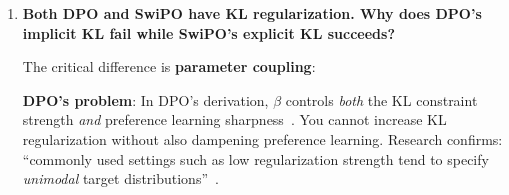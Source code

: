 \begin{enumerate}[label=\textbf{Q\arabic*.}, leftmargin=*, itemsep=8pt]
\textbf{Why it matters}: Instruction-conditioned alignment \textit{requires} multiple behavioral modes:
\begin{itemize}[leftmargin=*,itemsep=1pt]
    \item Mode 1: ``Be concise'' $\rightarrow$ short responses
    \item Mode 2: ``Be detailed'' $\rightarrow$ comprehensive responses
    \item Mode 3: ``Be formal'' $\rightarrow$ professional tone
\end{itemize}

A mode-collapsed model produces similar outputs regardless of instruction, which is exactly what we observe with DPO (+0.001 instruction sensitivity). SwiPO's explicit KL prevents this collapse by maintaining proximity to the reference policy's behavioral diversity.

\vspace{4mm}

\item \textbf{Both DPO and SwiPO have KL regularization. Why does DPO's implicit KL fail while SwiPO's explicit KL succeeds?}

 The critical difference is \textbf{parameter coupling}:

\begin{table}[ht!]
\centering
\normalsize
\renewcommand{\arraystretch}{1.2}
\caption{DPO implicit vs SwiPO explicit KL: parameter coupling comparison.}
\label{tab:faq_implicit_vs_explicit_kl}
\end{table}

\textbf{DPO's problem}: In DPO's derivation, $\beta$ controls \textit{both} the KL constraint strength \textit{and} preference learning sharpness~\cite{rafailov2023direct}. You cannot increase KL regularization without also dampening preference learning. Research confirms: ``commonly used settings such as low regularization strength tend to specify \textit{unimodal} target distributions''~\cite{liu2024kl}.


\end{enumerate}
